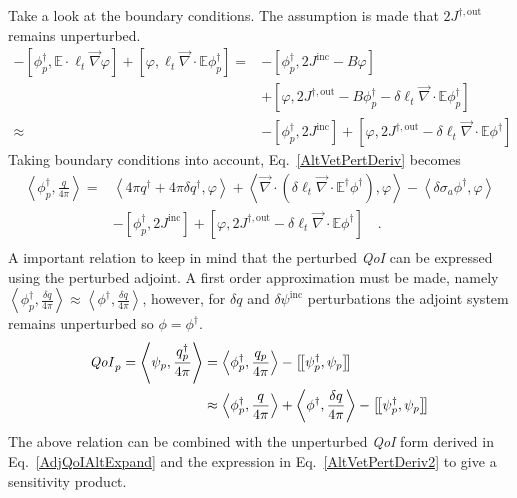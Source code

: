 \documentclass[12pt]{report}
\newcommand{\bra}{\left\langle}
\newcommand{\ket}{\right\rangle}
\newcommand{\sbraSN}{\left[ \! \left[}
\newcommand{\sketSN}{\right] \! \right]}
\newcommand{\sbra}{\left[}
\newcommand{\sket}{\right]}
\renewcommand{\div}{\vec{\nabla} \cdot}
\newcommand{\grad}{\vec{\nabla}}
\newcommand{\Edd}{\mathbb{E}}
\newcommand{\siga}{\sigma_a}
\newcommand{\isigt}{\ell_t}
\newcommand{\angSource}{\frac{q}{4 \pi}}
\newcommand{\angSourcep}{\frac{q_p}{4 \pi}}
\newcommand{\angSourced}{\frac{\delta q}{4 \pi}}
\newcommand{\scalResp}{q^\dag}
\newcommand{\qoi}{{\it QoI}\xspace}
\begin{document}
Take a look at the boundary conditions. The assumption is made that $2 J^{\dag,\text{out}}$ remains unperturbed.
\begin{equation}
\begin{split}
 - \sbra \phi^\dag_p, \Edd \cdot \isigt \grad \varphi \sket  + \sbra \varphi, \isigt \div \Edd \phi_p^\dag \sket 
=&- \sbra \phi_p^\dag, 2J^{\text{inc}} - B \varphi \sket \\ 
&+ \sbra \varphi, 2 J^{\dag,\text{out}} - B \phi_p^\dag - \delta \isigt \div \Edd \phi_p^\dag \sket \\
\approx&- \sbra \phi_p^\dag, 2J^{\text{inc}} \sket + \sbra \varphi , 2 J^{\dag,\text{out}} - \delta \isigt \div \Edd \phi^\dag \sket 
\end{split}
\end{equation}
Taking boundary conditions into account, Eq.~\eqref{AltVetPertDeriv} becomes
\begin{equation}
\label{AltVetPertDeriv2}
\begin{split}
 \bra  \phi^\dag_p , \angSource \ket  =& \bra 4 \pi \scalResp + 4 \pi\delta \scalResp , \varphi \ket + \bra\div \left( \delta \isigt \div \Edd^\dag \phi^\dag  \right), \varphi \ket 
- \bra \delta \siga \phi^\dag , \varphi \ket \\
&- \sbra \phi_p^\dag, 2J^{\text{inc}} \sket + \sbra \varphi , 2 J^{\dag,\text{out}} - \delta \isigt \div \Edd \phi^\dag \sket  \quad . \\
\end{split}
\end{equation} 
A important relation to keep in mind that the perturbed \qoi can be expressed using the perturbed adjoint. A first order approximation must be made, namely $\bra \phi^\dag_p ,  \angSourced \ket \approx \bra \phi^\dag , \angSourced \ket$, however, for $\delta q$ and $\delta \psi^{\text{inc}}$ perturbations the adjoint system remains unperturbed so $\phi=\phi^\dag$.
\begin{equation}
\begin{split}
\qoi_p  = \bra \psi_p , \frac{q_p^\dag}{4 \pi} \ket &= \bra \phi^\dag_p , \angSourcep \ket - \sbraSN \psi^\dag_p,  \psi_p \sketSN \\
&\approx \bra \phi^\dag_p , \angSource \ket + \bra \phi^\dag , \angSourced \ket - \sbraSN \psi^\dag_p,  \psi_p \sketSN \\
\end{split} 
\end{equation}
The above relation can be combined with the unperturbed \qoi form derived in Eq.~\eqref{AdjQoIAltExpand} and the expression in  Eq.~\eqref{AltVetPertDeriv2} to give a sensitivity product. 
\end{document}
